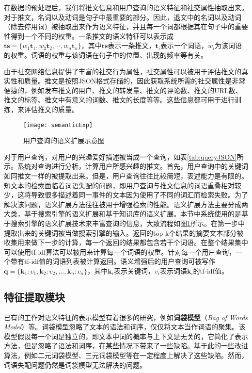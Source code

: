 在数据的预处理后，我们将推文信息和用户查询的语义特征和社交属性抽取出来。对于推文，名词以及动词是句子中最重要的部分。因此，退文中的名词以及动词（除去停用词）被抽取出来作为语义特征，并且每一个词都根据其在句子中的重要性得到一个不同的权重。一条推文的语义特征可以表示成$\mathbf{ts} = \{ {w_1}{\mathbf{t}_1},{w_2}{\mathbf{t}_2},\cdots,{w_n}{\mathbf{t}_n}\}$，其中$\mathbf{ts}$表示一条推文，$\mathbf{t}_i$表示一个词语，$w_i$为该词语的权重。词语的权重与该词语在句子中的位置、出现的频率等有关。

由于社交网络信息提供了丰富的社交行为属性，社交属性可以被用于评估推文的真实性和质量。推文是按照JSON格式存储的，因此获取系统所需的社交属性是非常便捷的，例如发布推文的用户、推文的转发量、推文的评论数、推文的URL数、推文的标签、推文中有意义的词数、推文的长度等等。这些信息都可用于进行训练，来评估推文的质量。

\begin{figure}[!htbp] %
  \centering
  \texttt{[image: semanticExp]}
  \caption{用户查询的语义扩展示意图}
  \label{fig:semanticExp}
\end{figure}

对于用户查询，对用户的兴趣爱好描述被当成一个查询，如表\ref{tab:queryJSON}所示。系统对查询进行分析，计算用户所感兴趣的推文。首先，用户查询中的关键词如同推文一样的被提取出来。但是，用户查询往往比较简短，表述能力是有限的。短文本的检索面临着词语失配的问题，即用户查询与推文信息的词语重叠相对较少，这将导致很多描述着同一事件的文本因为使用了不同的词汇而检索失败。为了解决该问题，语义扩展方法往往被用于增强检索的性能。语义扩展方法主要分成两大类，基于搜索引擎的语义扩展和基于知识库的语义扩展。本节中系统使用的是基于搜索引擎的语义扩展技术来丰富查询的信息，大致流程如图\ref{fig:semanticExp}所示。在第一步中提取出来的关键词被当做搜索引擎的输入。返回的top-k个结果的摘要文本部分被收集用来做下一步的计算，每一个返回的结果都包含若干个词语。在整个结果集中可以使用tf-idf算法可以被用来计算每一个词语的权重。针对每一个用户查询，一个带有tf-idf值的词语列表被计算返回。语义增强后的用户查询可被写作$\mathbf{q} = \{ {\mathbf{k}_1}:{v_1},{\mathbf{k}_2}:{v_2},...,{\mathbf{k}_n}:{v_n}\}$，其中$\mathbf{k}_i$表示关键词，$v_i$表示词语$\mathbf{k}_i$的tf-idf值。

\subsection{特征提取模块}
\label{subsec2:featureRep}
已有的工作对语义特征的表示模型有着很多的研究，例如\textbf{词袋模型}（\textit{Bag of Words Model}）等。词袋模型忽略了文本的语法和词序，仅仅将文本当作词语的聚集。该模型假设每一个词是独立的，即文本中词的概率与上下文是无关的，它简化了表示方法，但是忽略了语法和词序，在某些情况下带来了一些缺陷。基于此的一些改进算法，例如二元词袋模型、三元词袋模型等在一定程度上解决了这些缺陷。然而，词语失配问题仍然是词袋模型无法解决的问题。

